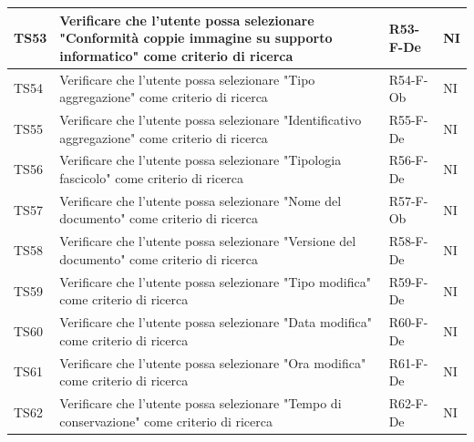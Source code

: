 \documentclass[a4paper,12pt]{article}
\begin{document}
\begin{longtable}{|M{1.2cm}|M{6.3cm}|M{2.5cm}|M{1.5cm}|}
                TS53 & Verificare che l'utente possa selezionare "Conformità coppie immagine su supporto informatico" come criterio di ricerca & R53-F-De & NI \\
                \hline
                                
                TS54 & Verificare che l'utente possa selezionare "Tipo aggregazione" come criterio di ricerca & R54-F-Ob & NI \\
                \hline
                                
                TS55 & Verificare che l'utente possa selezionare "Identificativo aggregazione" come criterio di ricerca & R55-F-De & NI \\
                \hline
                                
                TS56 & Verificare che l'utente possa selezionare "Tipologia fascicolo" come criterio di ricerca & R56-F-De & NI \\
                \hline
                                
                TS57 & Verificare che l'utente possa selezionare "Nome del documento" come criterio di ricerca & R57-F-Ob & NI \\
                \hline
                                
                TS58 & Verificare che l'utente possa selezionare "Versione del documento" come criterio di ricerca & R58-F-De & NI \\
                \hline
                                
                TS59 & Verificare che l'utente possa selezionare "Tipo modifica" come criterio di ricerca & R59-F-De & NI \\
                \hline
                                
                TS60 & Verificare che l'utente possa selezionare "Data modifica" come criterio di ricerca & R60-F-De & NI \\
                \hline
                                
                TS61 & Verificare che l'utente possa selezionare "Ora modifica" come criterio di ricerca & R61-F-De & NI \\
                \hline
                                
                TS62 & Verificare che l'utente possa selezionare "Tempo di conservazione" come criterio di ricerca & R62-F-De & NI \\
                \hline
                                

\end{longtable}
\end{document}
